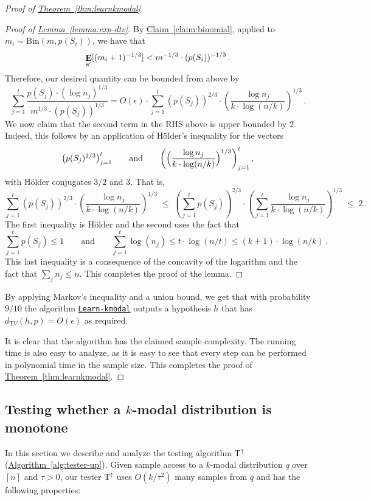 \documentclass[10pt]{article}
\theoremstyle{definition}
\numberwithin{equation}{section}
\newcommand{\expref}[2]{\texorpdfstring{\hyperref[#2]{#1~\ref{#2}}}{#1~\ref{#2}}}
\DeclareMathOperator*{\E}{{\bf E}}
\newcommand{\algorithml}[1]{{\normalfont\texttt{#1}}}
\newcommand{\dtv}{d_{\mathrm TV}}
\newcommand{\eps}{\epsilon}
\newcommand{\TND}{{\mathrm{T^{\uparrow}}}}
\begin{document}
\begin{proof}[Proof of \expref{Theorem}{thm:learnkmodal}]
\begin{proof}[Proof of \expref{Lemma}{lemma:exp-dtv}]
By \expref{Claim}{claim:binomial}, applied to $m_i  \sim \mathrm{Bin}(m,p(S_i))$, we have that
\[
\E_{\mathbf{s}'} [ (m_i+1)^{-1/3}] < m^{-1/3} \cdot (p(S_i))^{-1/3}\,.
\]
Therefore, our desired quantity can be bounded from above by
$$\sum_{j=1}^{t} \frac {p(S_j) \cdot  (\log n_j)^{1/3}} {m^{1/3} \cdot (p(S_j)) ^{1/3}} =
O(\eps) \cdot \sum_{j=1}^{t}{(p(S_j))^{2/3} \cdot \left(\frac{\log n_j}{k \cdot \log(n/k)}\right)^{1/3}} \,.$$
We now claim that the second term in the RHS above is upper bounded by $2$.
Indeed, this follows by an application of H\"older's inequality
for the vectors
\[
\bigl(p(S_j)^{2/3}\bigr)_{j=1}^{t}\qquad\text{and}\qquad
\biggl(\Bigl(\frac{\log n_j} { k \cdot \log(n/k)}\Bigr)^{1/3}\biggr)_{j=1}^{t}\,,
\]
with  H\"older conjugates $3/2$ and $3$. That is,
%
\[
\sum_{j=1}^{t} \left(p(S_j)\right)^{2/3} \cdot \left(\frac{\log n_j}{ k \cdot \log(n/k)}\right)^{1/3} \;\leq\; \left( \sum_{j=1}^{t} p(S_j) \right)^{2/3} \cdot 
\left( \sum_{j=1}^{t} \frac{\log n_j}{ k \cdot \log(n/k)} \right)^{1/3} \;\leq\; 2\,.
\]
%
The first inequality is  H\"older and the second uses the fact
that  \[
\sum_{j=1}^{t} p(S_j) \leq 1\qquad\text{and}\qquad
\sum_{j=1}^t \log (n_j) \leq t \cdot \log(n/t) \leq (k+1) \cdot
\log(n/k)\,.
\]
This last inequality is a consequence of the concavity of the logarithm and the fact that $\sum_j n_j \leq n$. This completes the proof of the lemma.
\end{proof}

By applying Markov's inequality and a union bound, we get that with
probability $9/10$ the algorithm \hyperref[alg:learn-kmodal]{\algorithml{Learn-kmodal}}
outputs a hypothesis $h$ that has $\dtv(h,p) {=} O(\eps)$ as required.



It is clear that the algorithm has the claimed sample complexity.
The running time is also easy to analyze, as it is easy to see that
every step can be performed in polynomial time %
in the sample size. This completes the proof of \expref{Theorem}{thm:learnkmodal}.
\end{proof}


%

\subsection{Testing whether a \texorpdfstring{$k$-modal}{k-modal} distribution is monotone}
\label{ssec:test}


In this section we describe and analyze the testing  algorithm $\TND$ (\expref{Algorithm}{alg:tester-up}).
Given sample access to a $k$-modal distribution $q$ over $[n]$ and $\tau>0$,
our tester $\TND$ uses {$O(k/\tau^2)$} many samples from $q$ and has the
following properties:
%
\end{document}
